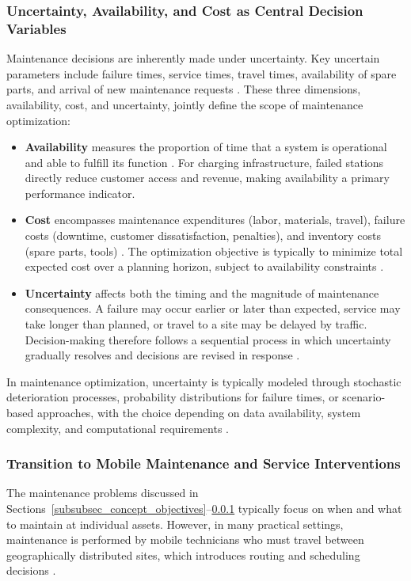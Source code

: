 \documentclass[12pt,oneside]{article}
\begin{document}
\subsubsection{Uncertainty, Availability, and Cost as Central Decision Variables}\label{subsubsec_uncertainty_availability_cost}
Maintenance decisions are inherently made under uncertainty.
Key uncertain parameters include failure times, service times, travel times, availability of spare
parts, and arrival of new maintenance requests \citep{dejonge2020review}.
These three dimensions, availability, cost, and uncertainty, jointly define the scope of maintenance optimization:
\begin{itemize}
  \setlength{\itemsep}{4pt}
  \item \textbf{Availability} measures the proportion of time that a system is operational and able to fulfill its function \citep{alaswad2017review}. For charging infrastructure, failed stations directly reduce customer access and revenue, making availability a primary performance indicator.
  \item \textbf{Cost} encompasses maintenance expenditures (labor, materials, travel), failure costs (downtime, customer dissatisfaction, penalties), and inventory costs (spare parts, tools) \citep{dejonge2020review, dekker1996applications}. The optimization objective is typically to minimize total expected cost over a planning horizon, subject to availability constraints \citep{alaswad2017review}.
  \item \textbf{Uncertainty} affects both the timing and the magnitude of maintenance consequences. A failure may occur earlier or later than expected, service may take longer than planned, or travel to a site may be delayed by traffic. Decision-making therefore follows a sequential process in which uncertainty gradually resolves and decisions are revised in response \citep{dejonge2020review}.
\end{itemize}
In maintenance optimization, uncertainty is typically modeled through stochastic deterioration processes, probability distributions for failure times, or scenario-based approaches, with the choice depending on data availability, system complexity, and computational requirements \citep{alaswad2017review}.


\subsubsection{Transition to Mobile Maintenance and Service Interventions}
The maintenance problems discussed in Sections~\ref{subsubsec_concept_objectives}--\ref{subsubsec_uncertainty_availability_cost} typically focus on when and what to
maintain at individual assets.
However, in many practical settings, maintenance is performed by mobile technicians who must travel
between geographically distributed sites, which introduces routing and scheduling decisions
\citep{dejonge2020review}.
\end{document}
